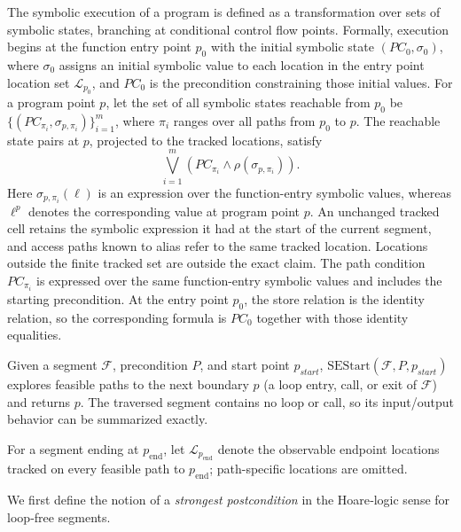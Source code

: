 The symbolic execution of a program is defined as a transformation over
sets of symbolic states, branching at conditional control flow points.
Formally, execution begins at the function entry point $p_0$ with the
initial symbolic state $(PC_0,\sigma_0)$, where $\sigma_0$ assigns an
initial symbolic value to each location in the entry point location set
$\mathcal{L}_{p_0}$, and $PC_0$ is the precondition constraining those
initial values. For a program point $p$, let the set of all symbolic
states reachable from $p_0$ be
$\{(PC_{\pi_i},\sigma_{p,\pi_i})\}_{i=1}^{m}$, where $\pi_i$ ranges over
all paths from $p_0$ to $p$.
{The reachable state pairs at $p$, projected to the tracked
locations, satisfy
\[
\bigvee_{i=1}^{m}
\left(
PC_{\pi_i}\land\rho(\sigma_{p,\pi_i})
\right).
\]
Here $\sigma_{p,\pi_i}(\ell)$ is an expression over the function-entry symbolic
values, whereas $\ell^{p}$ denotes the corresponding value at program
point $p$. An unchanged tracked cell retains the symbolic expression it had at the start of the current segment, and
access paths known to alias refer to the same tracked location.
Locations outside the finite tracked set are outside the exact claim. 
The path condition $PC_{\pi_i}$ is expressed over the same function-entry symbolic values and includes the starting
precondition. At the entry
point $p_0$, the store relation is the identity relation, so the
corresponding formula is $PC_0$ together with those identity
equalities.}


Given a segment $\mathcal F$, precondition $P$, and start point $p_{\mathit{start}}$, $\mathrm{SEStart}(\mathcal F,P,p_{\mathit{start}})$ explores feasible paths to the next boundary $p$ (a loop entry, call, or exit of $\mathcal F$) and returns $p$. The traversed segment contains no loop or call, so its input/output behavior can be summarized exactly.

For a segment ending at $p_{\mathrm{end}}$, let
$\mathcal{L}_{p_{\mathrm{end}}}$ denote the observable endpoint
locations tracked on every feasible path to $p_{\mathrm{end}}$;
path-specific locations are omitted.


We first define the notion of a \emph{strongest postcondition} in the Hoare‑logic sense for loop‑free segments.

